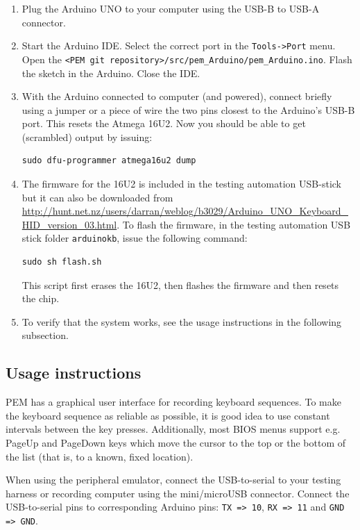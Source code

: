 \documentclass[a4paper,11pt]{article}
\newcommand{\cmd}[1]{\texttt{#1}}
\begin{document}
\begin{enumerate}
\item Plug the Arduino UNO to your computer using the USB-B to USB-A connector.

\item Start the Arduino IDE. Select the correct port in the \cmd{Tools->Port} menu. Open the \cmd{<PEM git repository>/src/pem\_Arduino/pem\_Arduino.ino}. Flash the sketch in the Arduino. Close the IDE.

\item With the Arduino connected to computer (and powered), connect briefly using a jumper or a piece of wire the two pins closest to the Arduino's USB-B port. This resets the Atmega 16U2. Now you should be able to get (scrambled) output by issuing:
\begin{lstlisting}
sudo dfu-programmer atmega16u2 dump
\end{lstlisting}

\item The firmware for the 16U2 is included in the testing automation USB-stick but it can also be downloaded from \url{http://hunt.net.nz/users/darran/weblog/b3029/Arduino_UNO_Keyboard_HID_version_03.html}. To flash the firmware, in the testing automation USB stick folder \cmd{arduinokb}, issue the following command:
\begin{lstlisting}
sudo sh flash.sh
\end{lstlisting}
This script first erases the 16U2, then flashes the firmware and then resets the chip.

\item To verify that the system works, see the usage instructions in the following subsection.
\end{enumerate}

\subsection{Usage instructions}
PEM has a graphical user interface for recording keyboard sequences. To make the keyboard sequence as reliable as possible, it is good idea to use constant intervals between the key presses. Additionally, most BIOS menus support e.g. PageUp and PageDown keys which move the cursor to the top or the bottom of the list (that is, to a known, fixed location).

When using the peripheral emulator, connect the USB-to-serial to your testing harness or recording computer using the mini/microUSB connector. Connect the USB-to-serial pins to corresponding Arduino pins: \cmd{TX => 10}, \cmd{RX => 11} and \cmd{GND => GND}.
\end{document}
